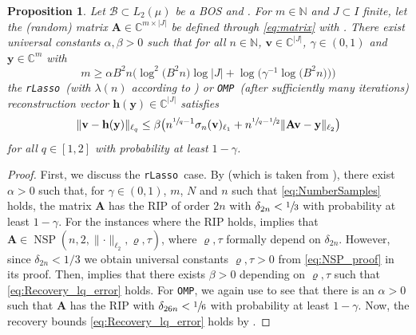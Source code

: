 \documentclass[11pt,reqno, a4paper]{article}
\numberwithin{equation}{section}
\newtheorem{prop}[theorem]{Proposition}
\newcommand{\rlasso}{\texttt{rLasso}}
\newcommand{\omp}{\texttt{OMP}}
\begin{document}
\begin{prop}\label{prop:Recovery_vector_errors}
Let $\mathcal{B} \subset L_2(\mu)$ be a BOS and .
For $m\in\mathbb{N}$ and $J\subset I$ finite, let the (random) matrix $\mathbf{A}\in\mathbb{C}^{m\times\lvert J\rvert}$ be defined through \eqref{eq:matrix} with .
There exist universal constants $\alpha, \beta>0$ such that for all $n \in \mathbb{N}$, $\mathbf{v} \in \mathbb{C}^{\lvert J\rvert}$, $\gamma \in (0,1)$ and ${\mathbf{y}} \in \mathbb{C}^m$ with 
\begin{equation}\label{eq:NumberSamples}
	m \geq \alpha B^2 n \bigl({\log^2} \bigl(B^2n\bigr) \log\lvert J\rvert + \log\bigl(\gamma^{-1}\log\bigl(B^2n\bigr)\bigr)\bigr)
\end{equation}
the \rlasso \ (with $\lambda(n)$ according to ) or \omp \ (after sufficiently many iterations) reconstruction vector $\mathbf{h}(\mathbf{y})\in\mathbb{C}^{\lvert J\rvert}$ satisfies
\begin{equation}\label{eq:Recovery_lq_error}
    \lVert \mathbf{v} - \mathbf{h}(\mathbf{y}) \rVert_{\ell_q} \leq \beta\bigl(n^{\sfrac{1}{q}-1}\sigma_n(\mathbf{v})_{\ell_1} + n^{\sfrac{1}{q}-\sfrac{1}{2}}  \lVert\mathbf{A}\mathbf{v}-\mathbf{y}\rVert_{\ell_2}\bigr)
\end{equation}
for all $q\in[1,2]$ with probability at least $1 - \gamma$.
\end{prop}

\begin{proof}
First, we discuss the \rlasso \ case.
By  (which is taken from \cite[Thm.\ 2.3]{BDJR21}), there exist $\alpha>0$ such that, for $\gamma \in (0,1)$, $m$, $N$ and $n$ such that \eqref{eq:NumberSamples} holds, the matrix $\mathbf{A}$ has the RIP of order $2n$ with $\delta_{2n}<\sfrac{1}{3}$ with probability at least $1 - \gamma$.
For the instances where the RIP holds,  implies that $\mathbf{A}\in\operatorname{NSP}(n,2,\lVert\cdot\rVert_{\ell_2},\varrho,\tau)$, where $\varrho,\tau$ formally depend on $\delta_{2n}$.
However, since $\delta_{2n}<1/3$ we obtain universal constants $\varrho,\tau>0$ from \eqref{eq:NSP_proof} in its proof.
Then,  implies that there exists $\beta>0$ depending on $\varrho, \tau$ such that \eqref{eq:Recovery_lq_error} holds. For \omp, we again use  to see that there is an $\alpha>0$ such that $\mathbf{A}$ has the RIP with $\delta_{26n}<\sfrac{1}{6}$ with probability at least $1 - \gamma$.
Now, the recovery bounds \eqref{eq:Recovery_lq_error} holds by .
\end{proof}
\end{document}
